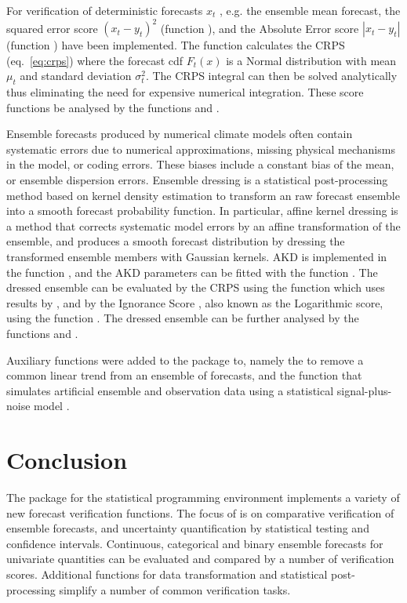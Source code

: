 \documentclass[article]{jss}\usepackage{graphicx, color}
\begin{document}
For verification of deterministic forecasts $x_t$ , e.g. the ensemble mean forecast, the squared error score $(x_t - y_t)^2$ (function ), and the Absolute Error score $|x_t - y_t|$ (function ) have been implemented.
The function  calculates the CRPS (eq.~\ref{eq:crps}) where the forecast cdf $F_t(x)$ is a Normal distribution with mean $\mu_t$ and standard deviation $\sigma^2_t$.
The CRPS integral can then be solved analytically \citep{gneiting2005calibrated} thus eliminating the need for expensive numerical integration.
These score functions be analysed by the functions  and .


Ensemble forecasts produced by numerical climate models often contain systematic errors due to numerical approximations, missing physical mechanisms in the model, or coding errors.
These biases include a constant bias of the mean, or ensemble dispersion errors.
Ensemble dressing is a statistical post-processing method based on kernel density estimation to transform an raw forecast ensemble into a smooth forecast probability function.
In particular, affine kernel dressing \citep[AKD; ][]{broecker2008from} is a method that corrects systematic model errors by an affine transformation of the ensemble, and produces a smooth forecast distribution by dressing the transformed ensemble members with Gaussian kernels.
AKD is implemented in the function , and the AKD parameters can be fitted with the function . 
The dressed ensemble can be evaluated by the CRPS using the function  which uses results by \citet{grimit2006the}, and by the Ignorance Score \citep{roulston2002evaluating}, also known as the Logarithmic score, using the function .
The dressed ensemble can be further analysed by the functions  and .

Auxiliary functions were added to the package to, namely the  to remove a common linear trend from an ensemble of forecasts, and the function  that simulates artificial ensemble and observation data using a statistical signal-plus-noise model \citep{siegert2016bayesian}.




\section{Conclusion}

The package  for the  statistical programming environment implements a variety of new forecast verification functions.
The focus of  is on comparative verification of ensemble forecasts, and uncertainty quantification by statistical testing and confidence intervals.
Continuous, categorical and binary ensemble forecasts for univariate quantities can be evaluated and compared by a number of verification scores.
Additional functions for data transformation and statistical post-processing simplify a number of common verification tasks.
\end{document}
